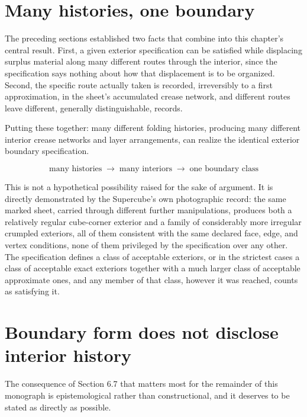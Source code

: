 \documentclass[11pt,oneside]{book}
\begin{document}
\hypertarget{many-histories-one-boundary}{%
\section{Many histories, one
boundary}\label{many-histories-one-boundary}}

The preceding sections established two facts that combine into this
chapter's central result. First, a given exterior specification can be
satisfied while displacing surplus material along many different routes
through the interior, since the specification says nothing about how
that displacement is to be organized. Second, the specific route
actually taken is recorded, irreversibly to a first approximation, in
the sheet's accumulated crease network, and different routes leave
different, generally distinguishable, records.

Putting these together: many different folding histories, producing many
different interior crease networks and layer arrangements, can realize
the identical exterior boundary specification.

\[\text{many histories} \;\rightarrow\; \text{many interiors} \;\rightarrow\; \text{one boundary class}\]

This is not a hypothetical possibility raised for the sake of argument.
It is directly demonstrated by the Supercube's own photographic record:
the same marked sheet, carried through different further manipulations,
produces both a relatively regular cube-corner exterior and a family of
considerably more irregular crumpled exteriors, all of them consistent
with the same declared face, edge, and vertex conditions, none of them
privileged by the specification over any other. The specification
defines a class of acceptable exteriors, or in the strictest cases a
class of acceptable exact exteriors together with a much larger class of
acceptable approximate ones, and any member of that class, however it
was reached, counts as satisfying it.

\hypertarget{boundary-form-does-not-disclose-interior-history}{%
\section{Boundary form does not disclose interior
history}\label{boundary-form-does-not-disclose-interior-history}}

The consequence of Section 6.7 that matters most for the remainder of
this monograph is epistemological rather than constructional, and it
deserves to be stated as directly as possible.
\end{document}
